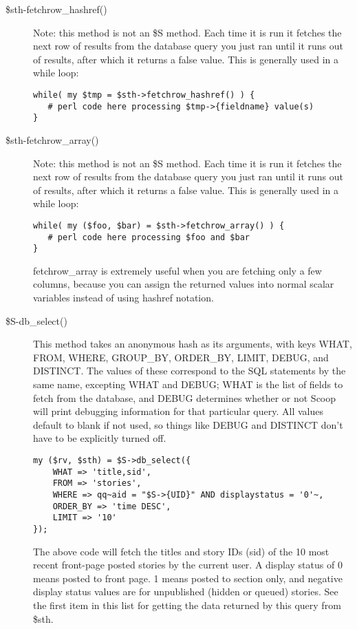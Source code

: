 \begin{description}
\item[\$sth-\latexhtml{$>$}{>}fetchrow\_hashref()] Note: this method is not an \$S method. Each time it is run it fetches the next row of results from the database query you just ran until it runs out of results, after which it returns a false value. This is generally used in a while loop:
\begin{verbatim}
while( my $tmp = $sth->fetchrow_hashref() ) {
   # perl code here processing $tmp->{fieldname} value(s)
}
\end{verbatim}

\item[\$sth-\latexhtml{$>$}{>}fetchrow\_array()] Note: this method is not an \$S method. Each time it is run it fetches the next row of results from the database query you just ran until it runs out of results, after which it returns a false value. This is generally used in a while loop:
\begin{verbatim}
while( my ($foo, $bar) = $sth->fetchrow_array() ) {
   # perl code here processing $foo and $bar
}
\end{verbatim}
fetchrow\_array is extremely useful when you are fetching only a few columns, because you can assign the returned values into normal scalar variables instead of using hashref notation.

\item[\$S-\latexhtml{$>$}{>}db\_select()] This method takes an anonymous hash as its arguments, with keys WHAT, FROM, WHERE, GROUP\_BY, ORDER\_BY, LIMIT, DEBUG, and DISTINCT. The values of these correspond to the SQL statements by the same name, excepting WHAT and DEBUG; WHAT is the list of fields to fetch from the database, and DEBUG determines whether or not Scoop will print debugging information for that particular query. All values default to blank if not used, so things like DEBUG and DISTINCT don't have to be explicitly turned off.
\begin{verbatim}
my ($rv, $sth) = $S->db_select({
	WHAT => 'title,sid',
	FROM => 'stories',
	WHERE => qq~aid = "$S->{UID}" AND displaystatus = '0'~,
	ORDER_BY => 'time DESC',
	LIMIT => '10'
});
\end{verbatim}
The above code will fetch the titles and story IDs (sid) of the 10 most recent front-page posted stories by the current user. A display status of 0 means posted to front page. 1 means posted to section only, and negative display status values are for unpublished (hidden or queued) stories. See the first item in this list for getting the data returned by this query from \$sth.


\end{description}
